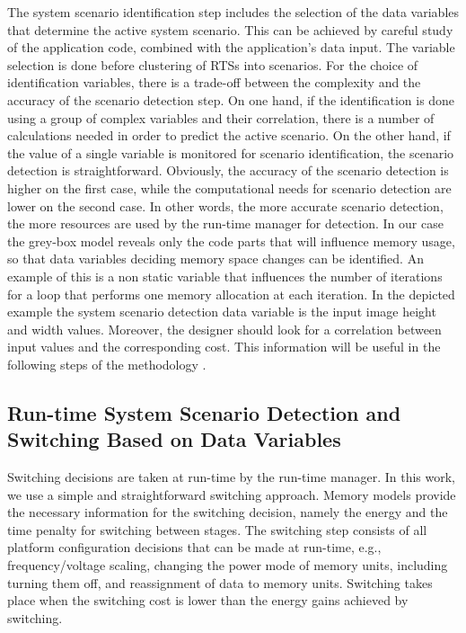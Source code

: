 The system scenario identification step includes the selection of the data variables that determine the active system scenario. 
This can be achieved by careful study of the application code, combined with the application's data input.
The variable selection is done before clustering of RTSs into scenarios.
For the choice of identification variables, there is a trade-off between the complexity and the accuracy of the scenario detection step.
On one hand, if the identification is done using a group of complex variables and their correlation, there is a number of calculations needed in order to predict the active scenario. 
On the other hand, if the value of a single variable is monitored for scenario identification, the scenario detection is straightforward.
Obviously, the accuracy of the scenario detection is higher on the first case, while the computational needs for scenario detection are lower on the second case.
In other words, the more accurate scenario detection, the more resources are used by the run-time manager for detection.
In our case the grey-box model reveals only the code parts that will influence memory usage, so that data variables deciding memory space changes can be identified. 
An example of this is a non static variable that influences the number of iterations for a loop that performs one memory allocation at each iteration. 
In the depicted example the system scenario detection data variable is the input image height and width values. 
Moreover, the designer should look for a correlation between input values and the corresponding cost. 
This information will be useful in the following steps of the methodology \cite{tcm}.

\subsection{Run-time System Scenario Detection and Switching Based on Data Variables}

Switching decisions are taken at run-time by the run-time manager. 
In this work, we use a simple and straightforward switching approach.
Memory models provide the necessary information for the switching decision, namely the energy and the time penalty for switching between stages.
The switching step consists of all platform configuration decisions that can be made at run-time, e.g., frequency/voltage scaling, changing the power mode of memory units, including turning them off, and reassignment of data to memory units. 
Switching takes place when the switching cost is lower than the energy gains achieved by switching. 

